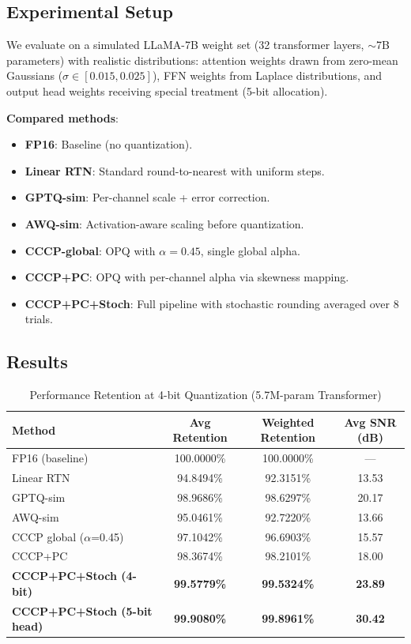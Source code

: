 \subsection{Experimental Setup}

We evaluate on a simulated LLaMA-7B weight set (32 transformer layers,
$\sim$7B parameters) with realistic distributions: attention weights
drawn from zero-mean Gaussians ($\sigma \in [0.015, 0.025]$), FFN
weights from Laplace distributions, and output head weights receiving
special treatment (5-bit allocation).

\textbf{Compared methods}:
\begin{itemize}
\item \textbf{FP16}: Baseline (no quantization).
\item \textbf{Linear RTN}: Standard round-to-nearest with uniform steps.
\item \textbf{GPTQ-sim}: Per-channel scale + error correction.
\item \textbf{AWQ-sim}: Activation-aware scaling before quantization.
\item \textbf{CCCP-global}: OPQ with $\alpha=0.45$, single global alpha.
\item \textbf{CCCP+PC}: OPQ with per-channel alpha via skewness mapping.
\item \textbf{CCCP+PC+Stoch}: Full pipeline with stochastic rounding
averaged over 8 trials.
\end{itemize}

\subsection{Results}

\begin{table}[h]
\centering
\caption{Performance Retention at 4-bit Quantization (5.7M-param Transformer)}
\label{tab:v5_retention}
\begin{tabular}{l|c|c|c}
\hline
\textbf{Method} & \textbf{Avg Retention} & \textbf{Weighted Retention} & \textbf{Avg SNR (dB)} \\
\hline
FP16 (baseline)                & 100.0000\% & 100.0000\% & --- \\
Linear RTN                     & 94.8494\%  & 92.3151\%  & 13.53 \\
GPTQ-sim                       & 98.9686\%  & 98.6297\%  & 20.17 \\
AWQ-sim                        & 95.0461\%  & 92.7220\%  & 13.66 \\
CCCP global ($\alpha$=0.45)     & 97.1042\%  & 96.6903\%  & 15.57 \\
CCCP+PC                        & 98.3674\%  & 98.2101\%  & 18.00 \\
\textbf{CCCP+PC+Stoch (4-bit)} & \textbf{99.5779\%}  & \textbf{99.5324\%}   & \textbf{23.89} \\
\textbf{CCCP+PC+Stoch (5-bit head)} & \textbf{99.9080\%} & \textbf{99.8961\%} & \textbf{30.42} \\
\hline
\end{tabular}
\end{table}

